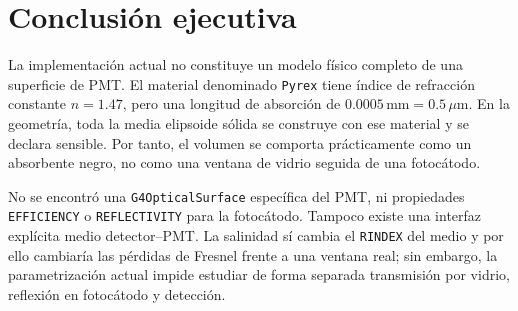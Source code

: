 \documentclass[11pt,a4paper]{article}
\begin{document}
\section{Conclusión ejecutiva}
La implementación actual no constituye un modelo físico completo de una
superficie de PMT. El material denominado \texttt{Pyrex} tiene índice de
refracción constante $n=1.47$, pero una longitud de absorción de
$0.0005\,\mathrm{mm}=0.5\,\mu\mathrm{m}$. En la geometría, toda la media
elipsoide sólida se construye con ese material y se declara sensible. Por
tanto, el volumen se comporta prácticamente como un absorbente negro, no como
una ventana de vidrio seguida de una fotocátodo.

No se encontró una \texttt{G4OpticalSurface} específica del PMT, ni propiedades
\texttt{EFFICIENCY} o \texttt{REFLECTIVITY} para la fotocátodo. Tampoco existe
una interfaz explícita medio detector--PMT. La salinidad sí cambia el
\texttt{RINDEX} del medio y por ello cambiaría las pérdidas de Fresnel frente a
una ventana real; sin embargo, la parametrización actual impide estudiar de
forma separada transmisión por vidrio, reflexión en fotocátodo y detección.
\end{document}
